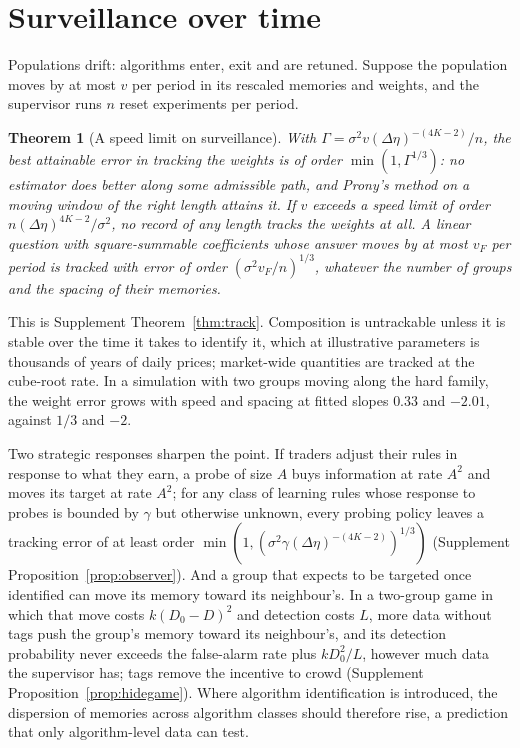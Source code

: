 \documentclass[12pt]{article}
\newtheorem{theorem}{Theorem}[section]
\theoremstyle{definition}
\theoremstyle{remark}
\begin{document}
\section{Surveillance over time}\label{n:dyn}

Populations drift: algorithms enter, exit and are retuned. Suppose the population moves by at most $v$ per period in its rescaled memories and weights, and the supervisor runs $n$ reset experiments per period.

\begin{theorem}[A speed limit on surveillance]\label{n:track}
With $\Gamma=\sigma^2v(\Delta\eta)^{-(4K-2)}/n$, the best attainable error in tracking the weights is of order $\min(1,\Gamma^{1/3})$: no estimator does better along some admissible path, and Prony's method on a moving window of the right length attains it. If $v$ exceeds a speed limit of order $n(\Delta\eta)^{4K-2}/\sigma^2$, no record of any length tracks the weights at all. A linear question with square-summable coefficients whose answer moves by at most $v_F$ per period is tracked with error of order $(\sigma^2v_F/n)^{1/3}$, whatever the number of groups and the spacing of their memories.
\end{theorem}

This is Supplement Theorem~\ref{thm:track}. Composition is untrackable unless it is stable over the time it takes to identify it, which at illustrative parameters is thousands of years of daily prices; market-wide quantities are tracked at the cube-root rate. In a simulation with two groups moving along the hard family, the weight error grows with speed and spacing at fitted slopes $0.33$ and $-2.01$, against $1/3$ and $-2$.

Two strategic responses sharpen the point. If traders adjust their rules in response to what they earn, a probe of size $A$ buys information at rate $A^2$ and moves its target at rate $A^2$; for any class of learning rules whose response to probes is bounded by $\gamma$ but otherwise unknown, every probing policy leaves a tracking error of at least order $\min(1,(\sigma^2\gamma(\Delta\eta)^{-(4K-2)})^{1/3})$ (Supplement Proposition~\ref{prop:observer}). And a group that expects to be targeted once identified can move its memory toward its neighbour's. In a two-group game in which that move costs $k(D_0-D)^2$ and detection costs $L$, more data without tags push the group's memory toward its neighbour's, and its detection probability never exceeds the false-alarm rate plus $kD_0^2/L$, however much data the supervisor has; tags remove the incentive to crowd (Supplement Proposition~\ref{prop:hidegame}). Where algorithm identification is introduced, the dispersion of memories across algorithm classes should therefore rise, a prediction that only algorithm-level data can test.
\end{document}
